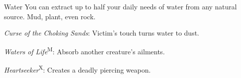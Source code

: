 {Water}
{You can extract up to half your daily needs of water from any natural source. Mud, plant, even rock.}
{
	\item 
	\item 
	\item 
	\item \textit{Curse of the Choking Sands}: Victim's touch turns water to dust.
	\item 
	\item \textit{Waters of Life}\textsuperscript{M}: Absorb another creature's ailments.
	\item 
	\item 
	\item \textit{Heartseeker}\textsuperscript{X}: Creates a deadly piercing weapon.
}